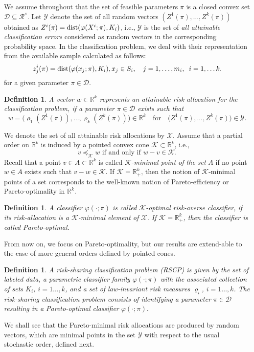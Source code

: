 \documentclass[10pt,letterpaper]{article}
\newcommand{\R}{\mathbb{R}}
\newcommand{\Kc}{\mathcal{K}}
\newcommand{\Xc}{\mathcal{X}}
\newcommand{\Yc}{\mathcal{Y}}
\newcommand{\1}{1{\hskip -2.55 pt}\hbox{I}}
\newcommand{\dist}{\mathop{\rm dist}}
\newtheorem{definition}[theorem]{Definition}
\begin{document}
We assume throughout that the set of feasible parameters $\pi$ is a closed convex set $\mathcal D\subseteq \mathcal R^s.$
Let $\Yc$ denote the set of all random vectors $(Z^1(\pi),\dots,Z^k(\pi))$ obtained as $Z^i(\pi)=\dist(\varphi(X^i;\pi),{K_i})$, i.e., 
$\Yc$ is the set of \emph{all attainable classification errors} considered as random vectors in the corresponding probability space. 
In the classification problem, we deal with their representation from the available sample calculated as follows:
\[
z^i_j(\pi)=\dist(\varphi(x_j;\pi),{K_i}), x_j\in S_i,\quad j=1,\dots, m_i,\;\; i=1,\dots k.
\]
for a given parameter $\pi\in \mathcal D$.
\begin{definition}
A vector $w\in \R^k$ represents an \emph{attainable risk allocation} for the classification problem, if a parameter $\pi\in\mathcal D$ exists such that 
\[
w = \big(\varrho_1(Z^1(\pi)), \dots, \varrho_k(Z^k(\pi))\big)\in\R^k\quad\text{for}\quad\big(Z^1(\pi),\dots,Z^k(\pi)\big)\in \Yc.
\]
\end{definition}
We denote the set of all attainable risk allocations by $\Xc$.
Assume that a partial order on $\R^k$ is induced by a pointed convex cone $\Kc\subset\R^k$, i.e.,
\[
v\preceq_\Kc w \text{ if and only if } w-v\in \Kc.
\]
Recall that a point $v\in A\subset \R^k$ is called $\Kc$-\emph{minimal point of the set} $A$ if no point $w\in A$ exists such that $v-w\in\Kc$.
If $\Kc=\R^k_+$, then the notion of $\Kc$-minimal points of a set corresponds to the well-known notion of Pareto-efficiency or Pareto-optimality in $\R^k$.
\begin{definition}
A classifier $\varphi(\cdot;\pi)$ is called $\Kc$-optimal risk-averse classifier, if its risk-allocation is a $\Kc$-minimal element of $\Xc$.
If $\Kc=\R^k_+$, then the classifier is called Pareto-optimal.
\end{definition}
From now on, we focus on Pareto-optimality, but our results are extend-able to the case of more general orders defined by pointed cones.
\begin{definition}
A \emph{risk-sharing classification problem} (RSCP) is given by the set of labeled data, a parametric classifier family
$\varphi(\cdot;\pi)$ with the associated collection of sets $K_i$, $i=1\dots,k$, and a set of law-invariant risk measures $\varrho_i$, $i=1\dots,k$. 
The risk-sharing classification problem consists of identifying a parameter $\pi\in\mathcal D$ resulting in a Pareto-optimal classifier $\varphi(\cdot;\pi)$.
\end{definition}
We shall see that the Pareto-minimal risk allocations are produced by random vectors, which are minimal points in the set $\Yc$ with respect to the usual stochastic order, defined next.
\end{document}
